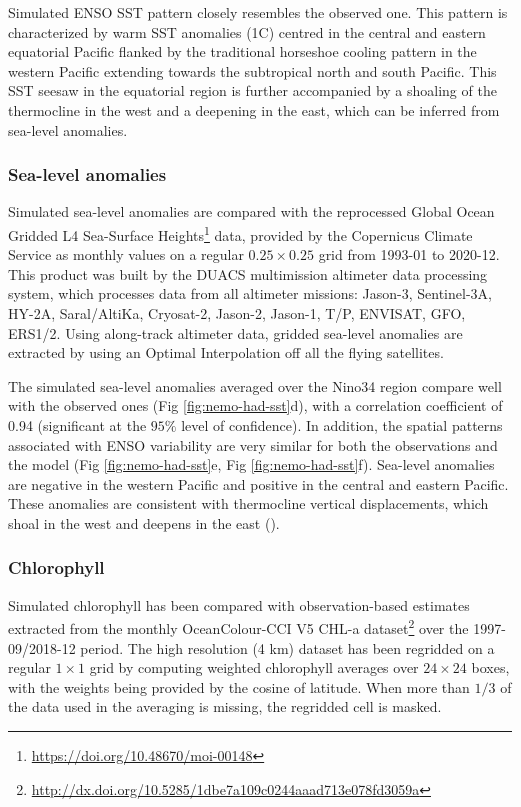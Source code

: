 Simulated ENSO SST  pattern closely resembles the observed one. This pattern is characterized by warm SST anomalies (1\degree{}C) centred in the central and eastern equatorial Pacific  flanked by the traditional horseshoe cooling pattern in the western Pacific extending towards the subtropical north and south Pacific. This SST seesaw in the equatorial region is further accompanied by a shoaling of the thermocline in the west and a deepening in the east, which can be inferred from sea-level anomalies.

\subsubsection{Sea-level anomalies}

Simulated sea-level anomalies are compared with the reprocessed Global Ocean Gridded L4 Sea-Surface Heights\footnote{\url{https://doi.org/10.48670/moi-00148}} data, provided by the Copernicus Climate Service as monthly values on a regular $0.25 \times 0.25$ grid from 1993-01 to 2020-12. This product was built by the DUACS multimission altimeter data processing system, which processes data from all altimeter missions: Jason-3, Sentinel-3A, HY-2A, Saral/AltiKa, Cryosat-2, Jason-2, Jason-1, T/P, ENVISAT, GFO, ERS1/2. Using along-track altimeter data, gridded sea-level anomalies are extracted by using an Optimal Interpolation off all the flying satellites. 

The simulated sea-level anomalies averaged over the Nino34 region compare well with the observed ones (Fig \ref{fig:nemo-had-sst}d), with a correlation coefficient of 0.94 (significant at the $95\%$ level of confidence). In addition, the spatial patterns associated with ENSO variability are very similar for both the observations and the model (Fig \ref{fig:nemo-had-sst}e, Fig \ref{fig:nemo-had-sst}f). Sea-level anomalies are negative in the western Pacific and positive in the central and eastern Pacific. These anomalies are consistent with thermocline vertical displacements, which shoal in the west and deepens in the east ().

\subsubsection{Chlorophyll}

Simulated chlorophyll has been compared with observation-based estimates extracted from the monthly OceanColour-CCI V5 CHL-a dataset\footnote{\url{http://dx.doi.org/10.5285/1dbe7a109c0244aaad713e078fd3059a}} \citep{sathyendranathOceanColourTimeSeries2019} over the 1997-09/2018-12 period. The high resolution (4 km)  dataset has been regridded on a regular $1\times 1$ grid by computing weighted chlorophyll averages over $24\times24$ boxes, with the weights being provided by the cosine of latitude. When more than $1/3$ of the data used in the averaging is missing, the regridded cell is masked.

